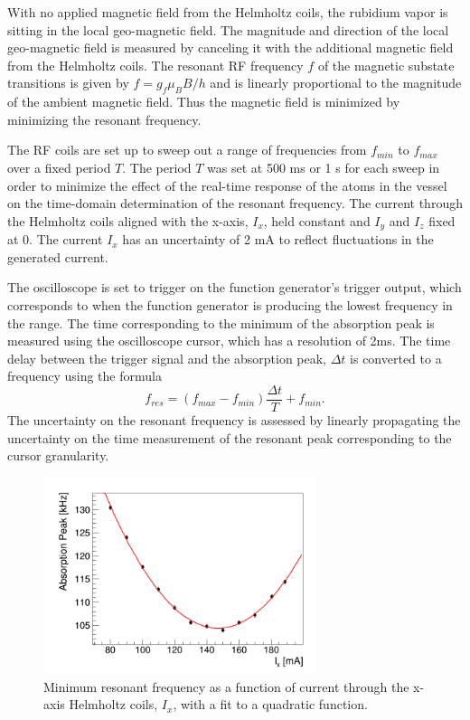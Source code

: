 With no applied magnetic field from the Helmholtz coils, the rubidium vapor is sitting in the local geo-magnetic field. The magnitude and direction of the local geo-magnetic field is measured by canceling it with the additional magnetic field from the Helmholtz coils. The resonant RF frequency $f$ of the magnetic substate transitions is given by 
\begin{math}
f = g_f \mu_B B/h
\end{math}
and is linearly proportional to the magnitude of the ambient magnetic field. Thus the magnetic field is minimized by minimizing the resonant frequency. 

The RF coils are set up to sweep out a range of frequencies from $f_{min}$ to $f_{max}$ over a fixed period $T$. The period $T$ was set at 500 ms or 1 s for each sweep in order to minimize the effect of the real-time response of the atoms in the vessel on the time-domain determination of the resonant frequency. The current through the Helmholtz coils aligned with the x-axis, $I_x$, held constant and $I_y$ and $I_z$ fixed at 0. The current $I_x$ has an uncertainty of 2 mA to reflect fluctuations in the generated current. 

The oscilloscope is set to trigger on the function generator's trigger output, which corresponds to when the function generator is producing the lowest frequency in the range. The time corresponding to the minimum of the absorption peak is measured using the oscilloscope cursor, which has a resolution of 2ms. The time delay between the trigger signal and the absorption peak, $\Delta t$ is converted to a frequency using the formula
\begin{equation}
f_{res} = (f_{max}-f_{min})\frac{\Delta t}{T} + f_{min}.
\end{equation}
The uncertainty on the resonant frequency is assessed by linearly propagating the uncertainty on the time measurement of the resonant peak corresponding to the cursor granularity. 

\begin{figure}[htb]
\includegraphics[width=8cm]{x_min1.png}
\caption{Minimum resonant frequency as a function of current through the x-axis Helmholtz coils, $I_x$, with a fit to a quadratic function. }
\label{geo}
\end{figure}

